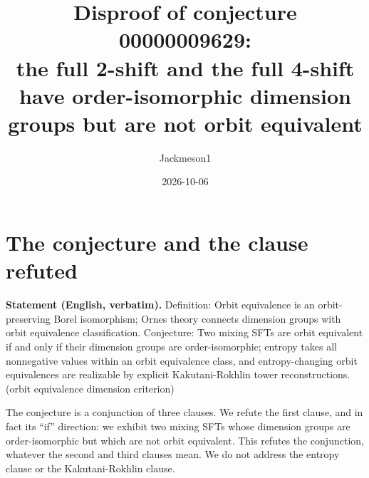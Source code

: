 \documentclass[11pt]{article}
\title{Disproof of conjecture 00000009629:\\ the full 2-shift and the full 4-shift have
order-isomorphic dimension groups but are not orbit equivalent}
\author{Jackmeson1}
\date{2026-10-06}
\theoremstyle{definition}
\theoremstyle{remark}
\begin{document}
\maketitle

\section{The conjecture and the clause refuted}

\textbf{Statement (English, verbatim).} Definition: Orbit equivalence is an orbit-preserving Borel
isomorphism; Ornes theory connects dimension groups with orbit equivalence classification.
Conjecture: Two mixing SFTs are orbit equivalent if and only if their dimension groups are
order-isomorphic; entropy takes all nonnegative values within an orbit equivalence class, and
entropy-changing orbit equivalences are realizable by explicit Kakutani-Rokhlin tower
reconstructions. (orbit equivalence dimension criterion)

The conjecture is a conjunction of three clauses. We refute the first clause, and in fact its
``if'' direction: we exhibit two mixing SFTs whose dimension groups are order-isomorphic but which
are not orbit equivalent. This refutes the conjunction, whatever the second and third clauses mean.
We do not address the entropy clause or the Kakutani-Rokhlin clause.
\end{document}

